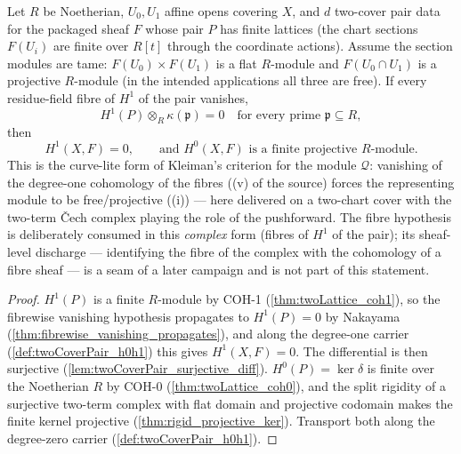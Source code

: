 \begin{theorem}
  \label{thm:twoCoverPair_rigidEngine}
  \leanok
  Let \(R\) be Noetherian, \(U_0, U_1\) affine opens covering \(X\), and \(d\)
  two-cover pair data for the packaged sheaf \(F\) whose pair \(P\) has finite lattices
  (the chart sections \(F(U_i)\) are finite over \(R[t]\) through the coordinate
  actions). Assume the section modules are tame: \(F(U_0) \times F(U_1)\) is a flat
  \(R\)-module and \(F(U_0 \cap U_1)\) is a projective \(R\)-module (in the intended
  applications all three are free). If every residue-field fibre of \(H^1\) of the pair
  vanishes,
  \[
    H^1(P) \otimes_R \kappa(\mathfrak p) = 0 \quad \text{for every prime }
      \mathfrak p \subseteq R,
  \]
  then
  \[
    H^1(X, F) = 0, \qquad \text{and } H^0(X, F) \text{ is a finite projective }
      R\text{-module}.
  \]
  This is the curve-lite form of Kleiman's criterion for the module \(\mathcal Q\):
  vanishing of the degree-one cohomology of the fibres ((v) of the source) forces the
  representing module to be free/projective ((i)) --- here delivered on a two-chart
  cover with the two-term \v Cech complex playing the role of the pushforward. The
  fibre hypothesis is deliberately consumed in this \emph{complex} form (fibres of
  \(H^1\) of the pair); its sheaf-level discharge --- identifying the fibre of the
  complex with the cohomology of a fibre sheaf --- is a seam of a later campaign and is
  not part of this statement.
\end{theorem}
\begin{proof}
  \leanok
  \(H^1(P)\) is a finite \(R\)-module by COH-1 (\ref{thm:twoLattice_coh1}), so the
  fibrewise vanishing hypothesis propagates to \(H^1(P) = 0\) by Nakayama
  (\ref{thm:fibrewise_vanishing_propagates}), and along the degree-one carrier
  (\ref{def:twoCoverPair_h0h1}) this gives \(H^1(X, F) = 0\). The differential is then
  surjective (\ref{lem:twoCoverPair_surjective_diff}). \(H^0(P) = \ker\delta\) is
  finite over the Noetherian \(R\) by COH-0 (\ref{thm:twoLattice_coh0}), and the split
  rigidity of a surjective two-term complex with flat domain and projective codomain
  makes the finite kernel projective (\ref{thm:rigid_projective_ker}). Transport both
  along the degree-zero carrier (\ref{def:twoCoverPair_h0h1}).
\end{proof}

